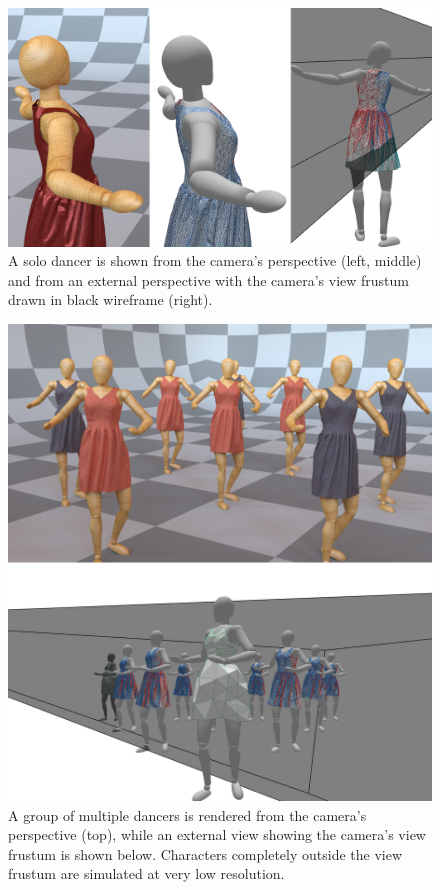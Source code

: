 \documentclass[10pt,journal,compsoc,twoside]{TexInputs/IEEEtran}
\begin{document}
\begin{figure}[t]
    \centering
    \includegraphics[width=1.0\columnwidth]{solo/solo}
    \caption{A solo dancer is shown from the camera's perspective (left, middle) and from
    an external perspective with the camera's view frustum drawn in black wireframe (right).}
    \label{fig:solo_dancer}
\end{figure}

\begin{figure}[t]
    \centering
    \includegraphics[width=1.0\columnwidth]{crowd/crowd}
    \caption{A group of multiple dancers is rendered from the camera's perspective (top), while 
	an external view showing the camera's view frustum is shown below. Characters
      completely outside the view frustum are simulated at very low resolution.}
    \label{fig:crowd}
\end{figure}
\end{document}
